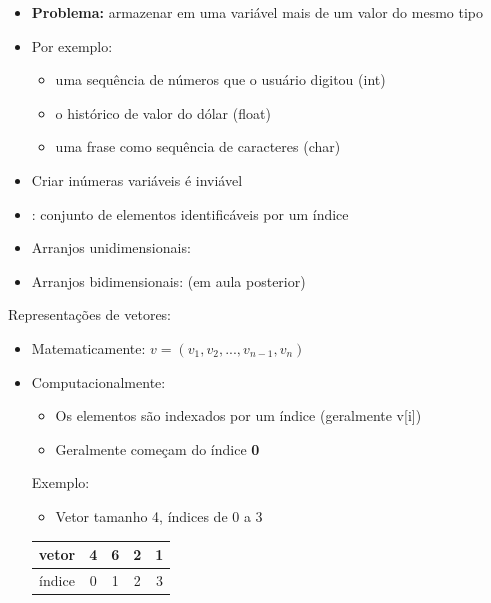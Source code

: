 \documentclass[portuguese,10pt,xcolor=table]{bredelebeamer}
\begin{document}
		\begin{frame}{\insertsection}
			\begin{itemize}
				\item \textbf{Problema:} armazenar em uma variável mais de um valor do mesmo tipo
				\item Por exemplo:
					\begin{itemize}
						\item uma sequência de números que o usuário digitou (int)
						\item o histórico de valor do dólar (float)
						\item uma frase como sequência de caracteres (char)
					\end{itemize}
				\item Criar inúmeras variáveis é inviável
					
			\end{itemize}
		\end{frame}	

		\begin{frame}{\insertsection}
			\begin{itemize}
				\item {}: conjunto de elementos identificáveis por um índice
				\item Arranjos unidimensionais: 
				\item Arranjos bidimensionais:  (em aula posterior)
			\end{itemize}
		\end{frame}	

		\def\WN[#1]{\colorbox{white!40}{#1}}
		\def\VN[#1]{\colorbox{blue!40}{#1}}
		\begin{frame}{\insertsection}
			Representações de vetores:
			\begin{itemize}
				\item Matematicamente: $v = (v_1, v_2, ..., v_{n-1}, v_n)$
				\item Computacionalmente:
					\begin{itemize}
						\item Os elementos são indexados por um índice (geralmente v[i])
						\item Geralmente começam do índice \textbf{0}
					\end{itemize}
					Exemplo:
					\begin{itemize}
						\item Vetor tamanho 4, índices de 0 a 3
					\end{itemize}
			\begin{table}
				\small
				\setlength{\tabcolsep}{0pt}	
				\begin{tabular}{|c|c|c|c|c|}
					\hline
					vetor 	&\VN[4]&\VN[6]&\VN[2]&\VN[1] \\\hline
					índice 		&\VN[0]&\VN[1]&\VN[2]&\VN[3] \\\hline
				\end{tabular}
			\end{table}
			\end{itemize}
		\end{frame}	
\end{document}
